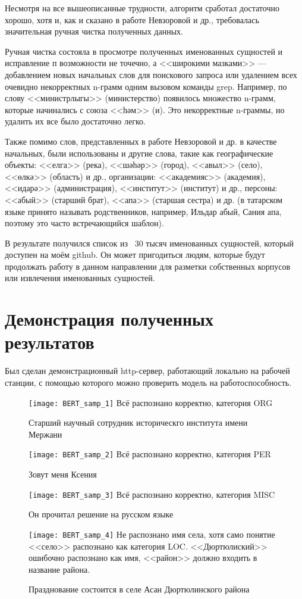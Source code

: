 Несмотря на все вышеописанные трудности, алгоритм сработал достаточно хорошо, хотя и, как и сказано в работе Невзоровой и др., требовалась значительная ручная чистка полученных данных.

Ручная чистка состояла в просмотре полученных именованных сущностей и исправление п возможности не точечно, а <<широкими мазками>> --- добавлением новых начальных слов для поискового запроса или удалением всех очевидно некорректных n-грамм одним вызовом команды grep. Например, по слову <<министрлыгы>> (министерство) появилось множество n-грамм, которые начинались с союза <<һәм>> (и). Это некорректные n-граммы, но удалить их все было достаточно легко. 

Также помимо слов, представленных в работе Невзоровой и др. в качестве начальных, были использованы и другие слова, такие как географические объекты: <<елга>> (река), <<шәһәр>> (город), <<авыл>> (село), <<өлкә>> (область) и др., организации:  <<академияс>> (академия), <<идарә>> (администрация), <<институт>> (институт) и др., персоны: <<абый>> (старший брат), <<апа>> (старшая сестра) и др. (в татарском языке принято называть родственников, например, Ильдар абый, Сания апа, поэтому это часто встречающийся шаблон).

В результате получился список из ~30 тысяч именованных сущностей, который доступен на моём github. %
Он может пригодиться людям, которые будут продолжать работу в данном направлении для разметки собственных корпусов или извлечения именованных сущностей. 

\section{Демонстрация полученных результатов}

Был сделан демонстрационный http-сервер, работающий локально на рабочей станции, с помощью которого можно проверить модель на работоспособность.


\begin{figure}[H]
\caption{Старший научный сотрудник историческго института имени Мержани}
\texttt{[image: BERT\_samp\_1]}
Всё распознано корректно, категория ORG
\label{fig:BERT_samp_1}
\end{figure}
\begin{figure}[H]
\caption{Зовут меня Ксения}
\texttt{[image: BERT\_samp\_2]}
Всё распознано корректно, категория PER
\label{fig:BERT_samp_2}
\end{figure}
\begin{figure}[H]
\caption{Он прочитал решение на русском языке}
\texttt{[image: BERT\_samp\_3]}
Всё распознано корректно, категория MISC
\label{fig:BERT_samp_3}
\end{figure}
\begin{figure}[H]
\caption{Празднование состоится в селе Асан Дюртюлинского района}
\texttt{[image: BERT\_samp\_4]}
Не распознано имя села, хотя само понятие <<село>> распознано как категория LOC. <<Дюртюлиский>> ошибочно распознано как имя, <<район>> должно входить в название района.
\label{fig:BERT_samp_4}
\end{figure}




